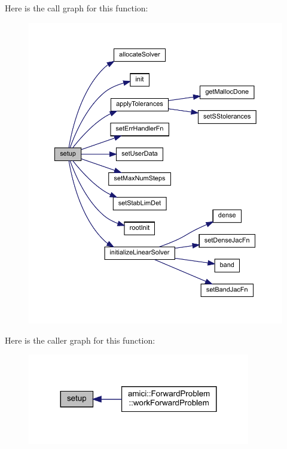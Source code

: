 Here is the call graph for this function\+:
\nopagebreak
\begin{figure}[H]
\begin{center}
\leavevmode
\includegraphics[width=350pt]{classamici_1_1_solver_a5cffde567803181ec12c71117c74b47a_cgraph}
\end{center}
\end{figure}
Here is the caller graph for this function\+:
\nopagebreak
\begin{figure}[H]
\begin{center}
\leavevmode
\includegraphics[width=275pt]{classamici_1_1_solver_a5cffde567803181ec12c71117c74b47a_icgraph}
\end{center}
\end{figure}
\mbox{\label{classamici_1_1_solver_a04ef010145a9a17746128e55d4e0a436}} 
